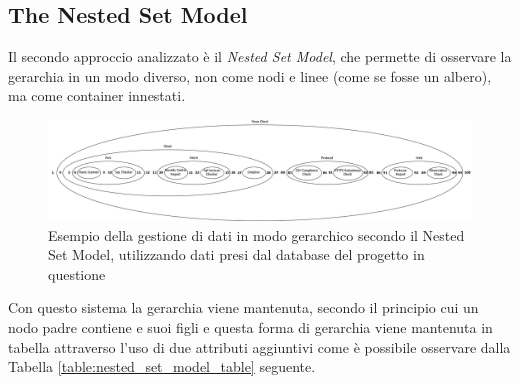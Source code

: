 \subsection{The Nested Set Model}
Il secondo approccio analizzato è il \textit{Nested Set Model}, che permette di osservare la gerarchia in un modo diverso, non 
come nodi e linee (come se fosse un albero), ma come container innestati. \\

\begin{figure}[ht!]
	\includegraphics[scale=0.30]{images/MC_Rec_NSM_Container.png}
	\caption{Esempio della gestione di dati in modo gerarchico secondo il Nested Set Model, utilizzando dati presi dal database del 
	progetto in questione}
	\label{fig:MC_Rec_NSM_Container}
\end{figure}

Con questo sistema la gerarchia viene mantenuta, secondo il principio cui un nodo padre contiene e suoi figli e questa forma di 
gerarchia viene mantenuta in tabella attraverso l'uso di due attributi aggiuntivi come è possibile osservare dalla Tabella 
\ref{table:nested_set_model_table} seguente. 

